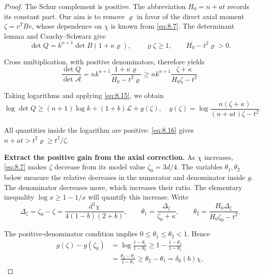 \begin{proof}
The Schur complement is positive. The abbreviation $H_0=n+at$ records its
constant part. Our aim is to remove $\varrho$ in favor of the direct axial
moment $\zeta=v^TBv$, whose dependence on $\chi$ is known from \eqref{eq:8.7}.
The determinant lemma and Cauchy--Schwarz give
\begin{equation}\label{eq:8.17}
\det Q=k^{n+1}\det B(1+\kappa\varrho),\qquad
\varrho\zeta\ge1,\qquad H_0-t^2\varrho>0.
\end{equation}

Cross multiplication, with positive denominators, therefore yields
\begin{equation}\label{eq:8.18}
\frac{\det Q}{\det\mathcal A}
=nk^{n+1}\frac{1+\kappa\varrho}{H_0-t^2\varrho}
\ge nk^{n+1}\frac{\zeta+\kappa}{H_0\zeta-t^2}.
\end{equation}

Taking logarithms and applying \eqref{eq:8.15}, we obtain
\begin{equation}\label{eq:8.19}
\log\det Q\ge(n+1)\log k+(1+b)\mathcal L+g(\zeta),
\quad
g(\zeta)=\log\frac{n(\zeta+\kappa)}{(n+at)\zeta-t^2}.
\end{equation}

All quantities inside the logarithm are positive: \eqref{eq:8.16} gives
$n+at>t^2\varrho\ge t^2/\zeta$.

\textbf{Extract the positive gain from the axial correction.} As $\chi$ increases,
\eqref{eq:8.7} makes $\zeta$ decrease from its model value $\zeta_0=3d/4$.
The variables $\theta_1,\theta_2$ below measure the relative decreases in the
numerator and denominator inside $g$. The denominator decreases more, which
increases their ratio. The elementary inequality $\log x\ge1-1/x$ will quantify
this increase. Write
\begin{equation}\label{eq:8.20}
\Delta_\zeta=\zeta_0-\zeta
=\frac{d^2\chi}{4(1-b)(2+b)},\qquad
\theta_1=\frac{\Delta_\zeta}{\zeta_0+\kappa},\qquad
\theta_2=\frac{H_0\Delta_\zeta}{H_0\zeta_0-t^2}.
\end{equation}

The positive-denominator condition implies $0\le\theta_1\le\theta_2<1$. Hence
\begin{equation}\label{eq:8.21}
\begin{aligned}
g(\zeta)-g(\zeta_0)
&=\log\frac{1-\theta_1}{1-\theta_2}
\ge1-\frac{1-\theta_2}{1-\theta_1}\\
&=\frac{\theta_2-\theta_1}{1-\theta_1}
\ge\theta_2-\theta_1=\delta_0(b)\chi,
\end{aligned}
\end{equation}


\end{proof}
